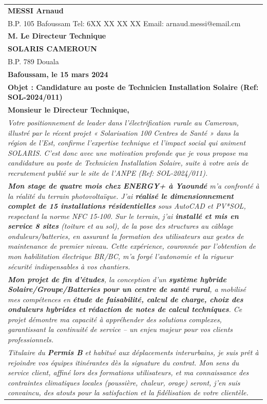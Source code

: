 \documentclass[11pt]{article}
\begin{document}
\begin{exoresolu}
\begin{center}
\begin{tabularx}{\linewidth}{|X|}\hline
\textbf{MESSI Arnaud} \\
B.P. 105 Bafoussam \quad Tel: 6XX XX XX XX \quad Email: arnaud.messi@email.cm \\ \hline
\textbf{M. Le Directeur Technique} \\
\textbf{SOLARIS CAMEROUN} \\
B.P. 789 Douala \\ \hline
\textbf{Bafoussam, le 15 mars 2024} \\ \hline
\textbf{Objet : Candidature au poste de Technicien Installation Solaire (Ref: SOL-2024/011)} \\ \hline
\textbf{Monsieur le Directeur Technique,} \\ \hline
\textit{Votre positionnement de leader dans l'électrification rurale au Cameroun, illustré par le récent projet « Solarisation 100 Centres de Santé » dans la région de l'Est, confirme l'expertise technique et l'impact social qui animent SOLARIS. C'est donc avec une motivation profonde que je vous propose ma candidature au poste de Technicien Installation Solaire, suite à votre avis de recrutement publié sur le site de l'ANPE (Ref: SOL-2024/011).} \\ \hline
\textit{\textbf{Mon stage de quatre mois chez ENERGY+ à Yaoundé} m'a confronté à la réalité du terrain photovoltaïque. J'ai \textbf{réalisé le dimensionnement complet de 15 installations résidentielles} sous AutoCAD et PV*SOL, respectant la norme NFC 15-100. Sur le terrain, j'ai \textbf{installé et mis en service 8 sites} (toiture et au sol), de la pose des structures au câblage onduleurs/batteries, en assurant la formation des utilisateurs aux gestes de maintenance de premier niveau. Cette expérience, couronnée par l'obtention de mon habilitation électrique BR/BC, m'a forgé l'autonomie et la rigueur sécurité indispensables à vos chantiers.} \\ \hline
\textit{\textbf{Mon projet de fin d'études}, la conception d'un \textbf{système hybride Solaire/Groupe/Batteries pour un centre de santé rural}, a mobilisé mes compétences en \textbf{étude de faisabilité, calcul de charge, choix des onduleurs hybrides et rédaction de notes de calcul techniques}. Ce projet démontre ma capacité à appréhender des solutions complexes, garantissant la continuité de service -- un enjeu majeur pour vos clients professionnels.} \\ \hline
\textit{Titulaire du \textbf{Permis B} et habitué aux déplacements interurbains, je suis prêt à rejoindre vos équipes itinérantes dès la signature du contrat. Mon sens du service client, affiné lors des formations utilisateurs, et ma connaissance des contraintes climatiques locales (poussière, chaleur, orage) seront, j'en suis convaincu, des atouts pour la satisfaction et la fidélisation de votre clientèle.} \\ \hline

\end{tabularx}
\end{center}
\end{exoresolu}
\end{document}
